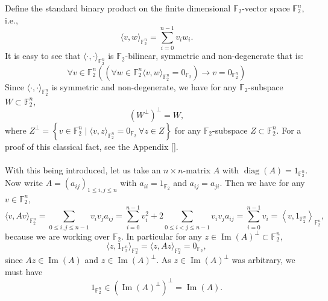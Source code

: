 \begin{solution}
    Define the standard binary product on the finite dimensional \( \mathbb{F}_{2} \)-vector space \( \mathbb{F}_2^n \), i.e.,
    \[
        \langle v, w \rangle_{\mathbb{F}_2^n} = \sum_{i=0}^{n-1} v_i w_i.
    \]
    It is easy to see that \( \langle \cdot, \cdot \rangle_{\mathbb{F}_2^n} \) is \( \mathbb{F}_{2} \)-bilinear, symmetric and non-degenerate that is:
    \[
        \forall v\in \mathbb{F}_2^n\left(\left(\forall w\in \mathbb{F}_2^n\langle v,w\rangle_{\mathbb{F}_2^n}=0_{\mathbb{F}_2}\right) \rightarrow v=0_{\mathbb{F}_2^n}\right)
    \]
    Since \( \langle \cdot, \cdot \rangle_{\mathbb{F}_2^n} \) is symmetric and non-degenerate, we have for any \( \mathbb{F}_2 \)-subspace \( W \subset \mathbb{F}_2^n \),
    \[
        \left(W^{\perp}\right)^{\perp} = W,
    \]
    where \( Z^\perp = \left\{ v \in \mathbb{F}_2^n \mid \langle v, z \rangle_{\mathbb{F}_2^n} = 0_{\mathbb{F}_2} \ \forall z \in Z \right\} \) for any \( \mathbb{F}_{2} \)-subspace \( Z \subset \mathbb{F}_2^n \). For a proof of this classical fact, see the Appendix [].
    \\\\
    With this being introduced, let us take an \( n \times n \)-matrix \( A \) with \( \operatorname{diag}\left(A\right)=1_{\mathbb{F}_2^n} \). Now write \( A = \left(a_{ij}\right)_{1 \leq i, j \leq n} \) with \( a_{ii} = 1_{\mathbb{F}_2} \) and \( a_{ij} = a_{ji} \). Then we have for any \( v \in \mathbb{F}_2^n \),
    \[
        \langle v, Av \rangle_{\mathbb{F}_2^n} = \sum_{0 \leq i, j \leq n-1} v_i v_j a_{ij} = \sum_{i=0}^{n-1} v_i^2 + 2 \sum_{0\leq i < j\leq n-1} v_i v_j a_{ij} = \sum_{i=0}^{n-1} v_i = \left\langle v, 1_{\mathbb{F}_2^n} \right\rangle_{\mathbb{F}_2^n},
    \]
    because we are working over \( \mathbb{F}_2 \). In particular for any \( z \in \operatorname{Im}\left(A\right)^\perp\subset \mathbb{F}_2^n \),
    \[
        \langle z, 1_{\mathbb{F}_2^n} \rangle_{\mathbb{F}_2^n} = \langle z, Az \rangle_{\mathbb{F}_2^n} = 0_{\mathbb{F}_2},
    \]
    since \( Az \in \operatorname{Im}\left(A\right) \) and \( z\in \operatorname{Im}\left(A\right)^{\perp} \). As \( z\in \operatorname{Im}\left(A\right)^{\perp} \) was arbitrary, we must have
    \[
        1_{\mathbb{F}_2^n}\in \left(\operatorname{Im}\left(A\right)^{\perp}\right)^{\perp} = \operatorname{Im}\left(A\right).
    \]
\end{solution}
